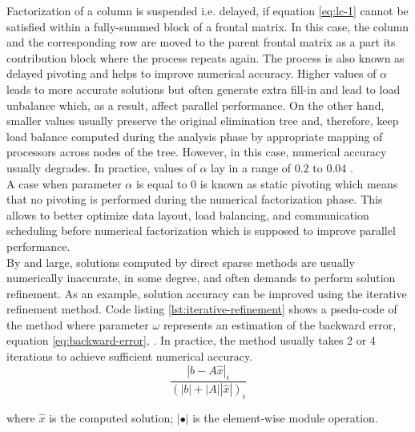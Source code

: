Factorization of a column is suspended i.e. delayed, if equation \ref{eq:lc-1} cannot be satisfied within a fully-summed block of a frontal matrix. In this case, the column and the corresponding row are moved to the parent frontal matrix as a part its contribution block where the process repeats again. The process is also known as delayed pivoting and helps to improve numerical accuracy. Higher values of $\alpha$ leads to more accurate solutions but often generate extra fill-in and lead to load unbalance which, as a result, affect parallel performance. On the other hand, smaller values usually preserve the original elimination tree and, therefore,  keep load balance computed during the analysis phase by appropriate mapping of processors across nodes of the tree. However, in this case, numerical accuracy usually degrades. In practice, values of $\alpha$ lay in a range of $0.2$ to $0.04$ .\\



A case when parameter $\alpha$ is equal to $0$ is known as static pivoting which means that no pivoting is performed during the numerical factorization phase. This allows to better optimize data layout, load balancing, and communication scheduling \cite{superlu-manual} before numerical factorization which is supposed to improve parallel performance.\\



By and large, solutions computed by direct sparse methods are usually numerically inaccurate, in some degree, and often demands to perform solution refinement. As an example, solution accuracy can be improved using the iterative refinement method. Code listing \ref{lst:iterative-refinement} shows a psedu-code of the method where parameter $\omega$ represents an estimation of the backward error, equation \ref{eq:backward-error}, \cite{mm-backward-error}. In practice, the method usually takes 2 or 4 iterations to achieve sufficient numerical accuracy.\\

\begin{equation} \label{eq:backward-error}
\frac{|b - A\hat{x}|_{i}}{(|b| + |A| |\hat{x}|)_{i}}
\end{equation}

where $\hat{x}$ is the computed solution; $|\bullet|$ is the element-wise module operation.\\


